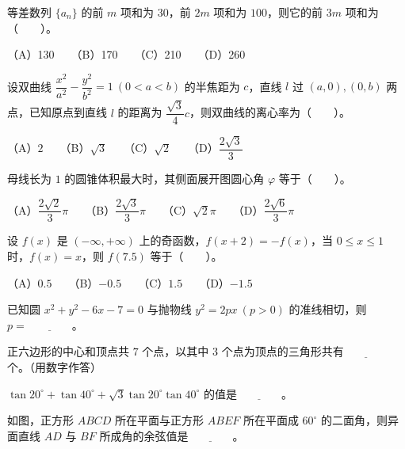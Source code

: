 \begin{question}
等差数列 $\{a_n\}$ 的前 $m$ 项和为 $30$，前 $2m$ 项和为 $100$，则它的前 $3m$ 项和为\mbox{（　　）}。

（A）130　　（B）170　　（C）210　　（D）260

\end{question}
\begin{question}
设双曲线 $\dfrac{x^2}{a^2}-\dfrac{y^2}{b^2}=1\ (0<a<b)$ 的半焦距为 $c$，直线 $l$ 过 $(a,0),(0,b)$ 两点，已知原点到直线 $l$ 的距离为 $\dfrac{\sqrt{3}}{4}c$，则双曲线的离心率为\mbox{（　　）}。

（A）$2$　　（B）$\sqrt{3}$　　（C）$\sqrt{2}$　　（D）$\dfrac{2\sqrt{3}}{3}$

\end{question}
\begin{question}
母线长为 $1$ 的圆锥体积最大时，其侧面展开图圆心角 $\varphi$ 等于\mbox{（　　）}。

（A）$\dfrac{2\sqrt{2}}{3}\pi$　　（B）$\dfrac{2\sqrt{3}}{3}\pi$　　（C）$\sqrt{2}\pi$　　（D）$\dfrac{2\sqrt{6}}{3}\pi$

\end{question}
\begin{question}
设 $f(x)$ 是 $(-\infty,+\infty)$ 上的奇函数，$f(x+2)=-f(x)$，当 $0\le x\le1$ 时，$f(x)=x$，则 $f(7.5)$ 等于\mbox{（　　）}。

（A）$0.5$　　（B）$-0.5$　　（C）$1.5$　　（D）$-1.5$

\end{question}
\begin{question}
已知圆 $x^2+y^2-6x-7=0$ 与抛物线 $y^2=2px\ (p>0)$ 的准线相切，则 $p=\underline{\qquad\qquad}$。

\end{question}
\begin{question}
正六边形的中心和顶点共 $7$ 个点，以其中 $3$ 个点为顶点的三角形共有$\underline{\qquad\qquad}$个。（用数字作答）

\end{question}
\begin{question}
$\tan20^\circ+\tan40^\circ+\sqrt{3}\tan20^\circ\tan40^\circ$ 的值是$\underline{\qquad\qquad}$。

\Needspace{0.4\textheight}
\end{question}
\begin{question}
如图，正方形 $ABCD$ 所在平面与正方形 $ABEF$ 所在平面成 $60^\circ$ 的二面角，则异面直线 $AD$ 与 $BF$ 所成角的余弦值是$\underline{\qquad\qquad}$。
\nopagebreak[4]
\begin{center}\end{center}
\nopagebreak[4]
\end{question}
